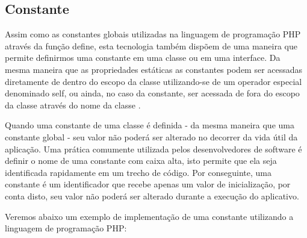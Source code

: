 \subsection{Constante}

Assim como as constantes globais utilizadas na linguagem de programação
\acs{PHP} através da função define, esta tecnologia também dispõem de uma maneira que
permite definirmos uma constante em uma classe ou em uma interface. Da mesma
maneira que as propriedades estáticas as constantes podem ser acessadas
diretamente de dentro do escopo da classe utilizando-se de um operador especial
denominado self, ou ainda, no caso da constante, ser acessada de fora do escopo
da classe através do nome da classe  \cite{programmingPhp}.

Quando uma constante de uma classe é definida - da mesma maneira que uma
constante global -  seu valor não poderá ser alterado no decorrer da vida útil
da aplicação. Uma prática comumente utilizada pelos desenvolvedores de software
é definir o nome de uma constante com caixa alta, isto permite que ela seja
identificada rapidamente em um trecho de código. Por conseguinte, uma constante
é um identificador que recebe apenas um valor de inicialização, por conta disto,
seu valor não poderá ser alterado durante a execução do aplicativo.

Veremos abaixo um exemplo de implementação de uma constante utilizando a
linguagem de programação PHP: